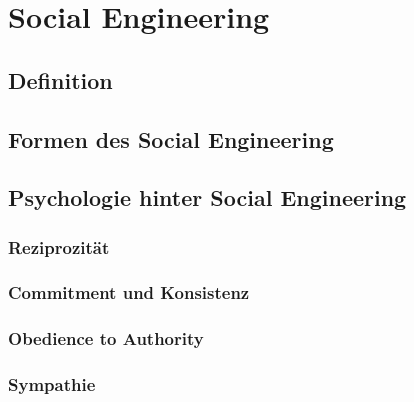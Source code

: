 \chapter{Social Engineering}\label{ch:SocialEngineering}

\section{Definition}
\section{Formen des Social Engineering}
\section{Psychologie hinter Social Engineering}
\subsection{Reziprozität}
\subsection{Commitment und Konsistenz}
\subsection{Obedience to Authority}
\subsection{Sympathie}